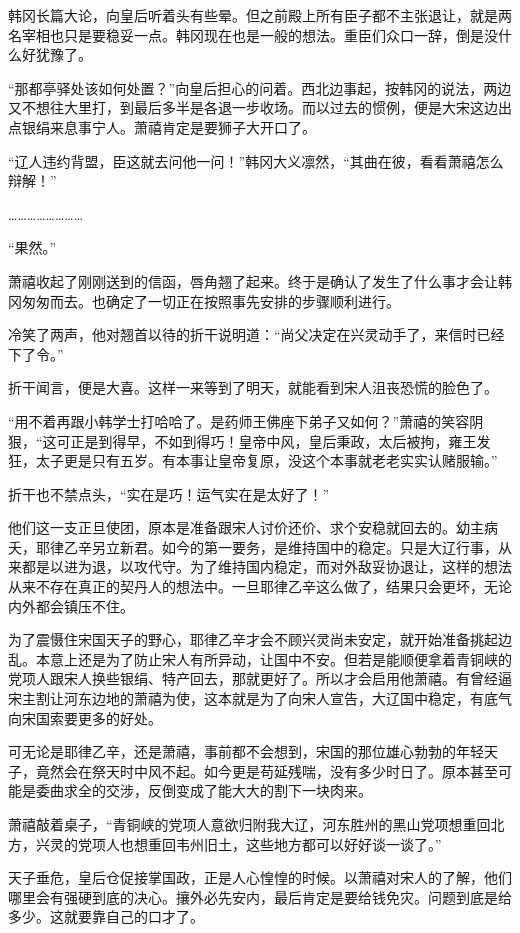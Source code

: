 韩冈长篇大论，向皇后听着头有些晕。但之前殿上所有臣子都不主张退让，就是两名宰相也只是要稳妥一点。韩冈现在也是一般的想法。重臣们众口一辞，倒是没什么好犹豫了。 

“那都亭驿处该如何处置？”向皇后担心的问着。西北边事起，按韩冈的说法，两边又不想往大里打，到最后多半是各退一步收场。而以过去的惯例，便是大宋这边出点银绢来息事宁人。萧禧肯定是要狮子大开口了。 

“辽人违约背盟，臣这就去问他一问！”韩冈大义凛然，“其曲在彼，看看萧禧怎么辩解！” 

…………………… 

“果然。” 

萧禧收起了刚刚送到的信函，唇角翘了起来。终于是确认了发生了什么事才会让韩冈匆匆而去。也确定了一切正在按照事先安排的步骤顺利进行。 

冷笑了两声，他对翘首以待的折干说明道：“尚父决定在兴灵动手了，来信时已经下了令。” 

折干闻言，便是大喜。这样一来等到了明天，就能看到宋人沮丧恐慌的脸色了。 

“用不着再跟小韩学士打哈哈了。是药师王佛座下弟子又如何？”萧禧的笑容阴狠，“这可正是到得早，不如到得巧！皇帝中风，皇后秉政，太后被拘，雍王发狂，太子更是只有五岁。有本事让皇帝复原，没这个本事就老老实实认赌服输。” 

折干也不禁点头，“实在是巧！运气实在是太好了！” 

他们这一支正旦使团，原本是准备跟宋人讨价还价、求个安稳就回去的。幼主病夭，耶律乙辛另立新君。如今的第一要务，是维持国中的稳定。只是大辽行事，从来都是以进为退，以攻代守。为了维持国内稳定，而对外敌妥协退让，这样的想法从来不存在真正的契丹人的想法中。一旦耶律乙辛这么做了，结果只会更坏，无论内外都会镇压不住。 

为了震慑住宋国天子的野心，耶律乙辛才会不顾兴灵尚未安定，就开始准备挑起边乱。本意上还是为了防止宋人有所异动，让国中不安。但若是能顺便拿着青铜峡的党项人跟宋人换些银绢、特产回去，那就更好了。所以才会启用他萧禧。有曾经逼宋主割让河东边地的萧禧为使，这本就是为了向宋人宣告，大辽国中稳定，有底气向宋国索要更多的好处。 

可无论是耶律乙辛，还是萧禧，事前都不会想到，宋国的那位雄心勃勃的年轻天子，竟然会在祭天时中风不起。如今更是苟延残喘，没有多少时日了。原本甚至可能是委曲求全的交涉，反倒变成了能大大的割下一块肉来。 

萧禧敲着桌子，“青铜峡的党项人意欲归附我大辽，河东胜州的黑山党项想重回北方，兴灵的党项人也想重回韦州旧土，这些地方都可以好好谈一谈了。” 

天子垂危，皇后仓促接掌国政，正是人心惶惶的时候。以萧禧对宋人的了解，他们哪里会有强硬到底的决心。攘外必先安内，最后肯定是要给钱免灾。问题到底是给多少。这就要靠自己的口才了。 

